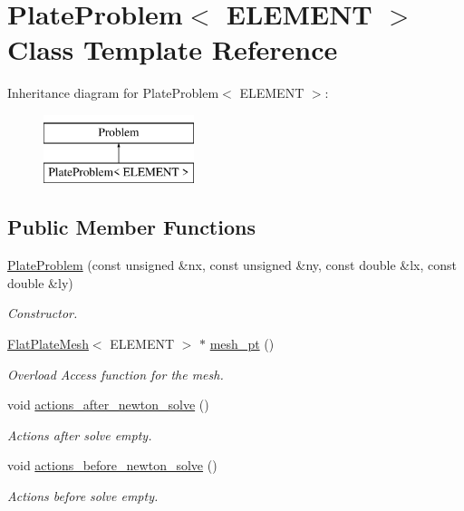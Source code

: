 \hypertarget{classPlateProblem}{}\section{Plate\+Problem$<$ E\+L\+E\+M\+E\+NT $>$ Class Template Reference}
\label{classPlateProblem}
Inheritance diagram for Plate\+Problem$<$ E\+L\+E\+M\+E\+NT $>$\+:\begin{figure}[H]
\begin{center}
\leavevmode
\includegraphics[height=2.000000cm]{classPlateProblem}
\end{center}
\end{figure}
\subsection*{Public Member Functions}
\begin{DoxyCompactItemize}
\item 
\hyperlink{classPlateProblem_a0430a872a8929fcda9bb205d0e69fabb}{Plate\+Problem} (const unsigned \&nx, const unsigned \&ny, const double \&lx, const double \&ly)
\begin{DoxyCompactList}\small\item\em Constructor. \end{DoxyCompactList}\item 
\hyperlink{classFlatPlateMesh}{Flat\+Plate\+Mesh}$<$ E\+L\+E\+M\+E\+NT $>$ $\ast$ \hyperlink{classPlateProblem_a964d7f9dec01b2d907fa7f3005418fcf}{mesh\+\_\+pt} ()
\begin{DoxyCompactList}\small\item\em Overload Access function for the mesh. \end{DoxyCompactList}\item 
void \hyperlink{classPlateProblem_aef1dfbdffcee81632af385733cb534f7}{actions\+\_\+after\+\_\+newton\+\_\+solve} ()
\begin{DoxyCompactList}\small\item\em Actions after solve empty. \end{DoxyCompactList}\item 
void \hyperlink{classPlateProblem_a3be5bbf9e7473c75b8f752e0d77f5955}{actions\+\_\+before\+\_\+newton\+\_\+solve} ()
\begin{DoxyCompactList}\small\item\em Actions before solve empty. \end{DoxyCompactList}\end{DoxyCompactItemize}
